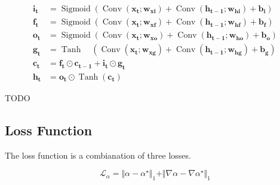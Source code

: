 \documentclass[final]{cvpr}
\begin{document}
\begin{equation}\label{convLSTM}
    \begin{aligned}
        \mathbf{i}_{\mathbf{t}} & = \operatorname{Sigmoid}\left(\operatorname{Conv}\left(\mathbf{x}_{\mathbf{t}} ; \mathbf{w}_{\mathbf{x i}}\right)+\operatorname{Conv}\left(\mathbf{h}_{\mathbf{t}-\mathbf{1}} ; \mathbf{w}_{\mathbf{h i}}\right)+\mathbf{b}_{\mathbf{i}}\right)    \\
        \mathbf{f}_{\mathbf{t}} & = \operatorname{Sigmoid}\left(\operatorname{Conv}\left(\mathbf{x}_{\mathbf{t}} ; \mathbf{w}_{\mathbf{x f}}\right)+\operatorname{Conv}\left(\mathbf{h}_{\mathbf{t}-\mathbf{1}} ; \mathbf{w}_{\mathbf{h f}}\right)+\mathbf{b}_{\mathbf{f}}\right)    \\
        \mathbf{o}_{\mathbf{t}} & = \operatorname{Sigmoid}\left(\operatorname{Conv}\left(\mathbf{x}_{\mathbf{t}} ; \mathbf{w}_{\mathbf{x o}}\right)+\operatorname{Conv}\left(\mathbf{h}_{\mathbf{t}-\mathbf{1}} ; \mathbf{w}_{\mathbf{h o}}\right)+\mathbf{b}_{\mathbf{o}}\right)    \\
        \mathbf{g}_{\mathbf{t}} & = \operatorname{Tanh} \quad\left(\operatorname{Conv}\left(\mathbf{x}_{\mathbf{t}} ; \mathbf{w}_{\mathbf{x g}}\right)+\operatorname{Conv}\left(\mathbf{h}_{\mathbf{t}-\mathbf{1}} ; \mathbf{w}_{\mathbf{h g}}\right)+\mathbf{b}_{\mathbf{g}}\right) \\
        \mathbf{c}_{\mathbf{t}} & = \mathbf{f}_{\mathbf{t}} \odot \mathbf{c}_{\mathbf{t}-\mathbf{1}}+\mathbf{i}_{\mathbf{t}} \odot \mathbf{g}_{\mathbf{t}}                                                                                                                           \\
        \mathbf{h}_{\mathbf{t}} & = \mathbf{o}_{\mathbf{t}} \odot \operatorname{Tanh}\left(\mathbf{c}_{\mathbf{t}}\right)
    \end{aligned}
\end{equation}

TODO

\subsection{Loss Function}

The loss function is a combianation of three losses.

\begin{equation}\label{lossAlpha}
    \mathcal{L}_\alpha=\Vert\alpha-\alpha^\star\Vert_1+\Vert\nabla\alpha-\nabla\alpha^\star\Vert_1
\end{equation}
\end{document}
